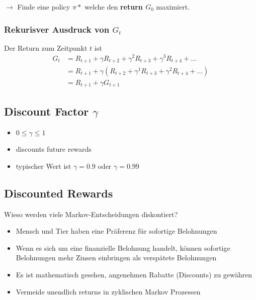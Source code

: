 \documentclass{article}
\theoremstyle{merke}
\theoremstyle{definition}
\begin{document}
            $\rightarrow$ Finde eine policy $\pi*$ welche den \textbf{return $G_0$} maximiert.
            
            \subsubsection{Rekurisver Ausdruck von $G_t$}
            Der Return zum Zeitpunkt $t$ ist
            \begin{equation}
                \begin{split}
                    G_t &= R_{t+1} + \gamma R_{t+2} + \gamma^2 R_{t+3} + \gamma^3 R_{t+4} + \dots \\
                    &= R_{t+1} + \gamma(R_{t+2} + \gamma^1 R_{t+3} + \gamma^2 R_{t+4} + \dots) \\
                    &= R_{t+1} + \gamma G_{t+1}
                \end{split}
            \end{equation}

                \subsection{Discount Factor $\gamma$}
            \begin{itemize}
                \item $0 \leq \gamma \leq 1$
                \item discounts future rewards
                \item typischer Wert ist $\gamma = 0.9$ oder $\gamma = 0.99$
            \end{itemize}

                \subsection{Discounted Rewards}
            Wieso werden viele Markov-Entscheidungen diskontiert?
            \begin{itemize}
                \item Mensch und Tier haben eine Präferenz für sofortige Belohnungen
                \item Wenn es sich um eine finanzielle Belohnung handelt, können sofortige Belohnungen mehr Zinsen einbringen als verspätete Belohnungen
                \item Es ist mathematisch gesehen, angenehmen Rabatte (Discounts) zu gewähren
                \item Vermeide unendlich returns in zyklischen Markov Prozessen
            \end{itemize}
\end{document}
